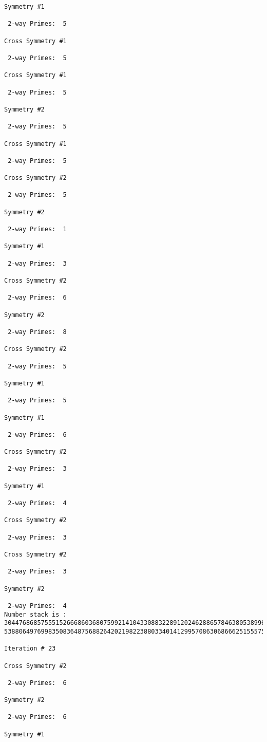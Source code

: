 \begin{verbatim}
Symmetry #1

 2-way Primes: 	5

Cross Symmetry #1

 2-way Primes: 	5

Cross Symmetry #1

 2-way Primes: 	5

Symmetry #2

 2-way Primes: 	5

Cross Symmetry #1

 2-way Primes: 	5

Cross Symmetry #2

 2-way Primes: 	5

Symmetry #2

 2-way Primes: 	1

Symmetry #1

 2-way Primes: 	3

Cross Symmetry #2

 2-way Primes: 	6

Symmetry #2

 2-way Primes: 	8

Cross Symmetry #2

 2-way Primes: 	5

Symmetry #1

 2-way Primes: 	5

Symmetry #1

 2-way Primes: 	6

Cross Symmetry #2

 2-way Primes: 	3

Symmetry #1

 2-way Primes: 	4

Cross Symmetry #2

 2-way Primes: 	3

Cross Symmetry #2

 2-way Primes: 	3

Symmetry #2

 2-way Primes: 	4
Number stack is :
30447686857555152666860368075992141043308832289120246288657846380538996794608835958544046240163340857
53880649769983508364875688264202198223880334014129957086306866625155575868674403758043361042640445859

Iteration #	23

Cross Symmetry #2

 2-way Primes: 	6

Symmetry #2

 2-way Primes: 	6

Symmetry #1


\end{verbatim}
